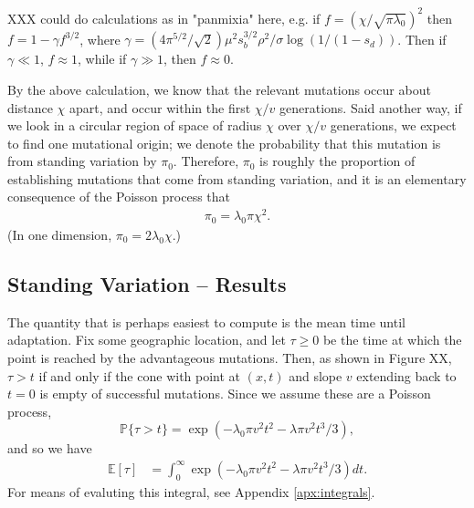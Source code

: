\documentclass{article}
\renewcommand{\P}{\mathbb{P}}
\newcommand{\E}{\mathbb{E}}
\begin{document}
XXX could do calculations as in "panmixia" here, e.g. if $f = (\chi/\sqrt{\pi \lambda_0})^2$ then
$f = 1-\gamma f^{3/2}$, where
$\gamma = (4 \pi^{5/2} / \sqrt{2}) \mu^2 s_b^{3/2} \rho^2 / \sigma \log(1/(1-s_d))$.
Then if $\gamma \ll 1$, $f \approx 1$, while if $\gamma \gg 1$, then $f \approx 0$.

By the above calculation, we know that the relevant mutations occur about distance $\chi$ apart, 
and occur within the first $\chi/v$ generations.
Said another way, if we look in a circular region of space of radius $\chi$ over $\chi/v$ generations,
we expect to find one mutational origin;
we denote the probability that this mutation is from standing variation by $\pi_0$.
Therefore, $\pi_0$ is roughly the proportion of establishing mutations that come from standing variation,
and it is an elementary consequence of the Poisson process that
\begin{align} \label{eqn:pizero}
    \pi_0 = \lambda_0 \pi \chi^2 .
\end{align}
(In one dimension, $\pi_0 = 2 \lambda_0 \chi$.)

\subsection{Standing Variation -- Results} 

The quantity that is perhaps easiest to compute is the mean time until adaptation.
Fix some geographic location, and let $\tau\ge0$ be the time at which the point is reached by the advantageous mutations.
Then, as shown in Figure XX,
$\tau > t$ if and only if the cone with point at $(x,t)$ and slope $v$ extending back to $t=0$ is empty of successful mutations.
Since we assume these are a Poisson process, 
\[
    \P\{ \tau > t \} = \exp\left( - \lambda_0 \pi v^2 t^2 - \lambda \pi v^2 t^3 / 3 \right) ,
\]
and so we have
\begin{align}
    \E[\tau] %
        &= \int_0^\infty \exp\left( - \lambda_0 \pi v^2 t^2 - \lambda \pi v^2 t^3 / 3 \right) dt.
\end{align}
For means of evaluting this integral, see Appendix \ref{apx:integrals}.

\end{document}
